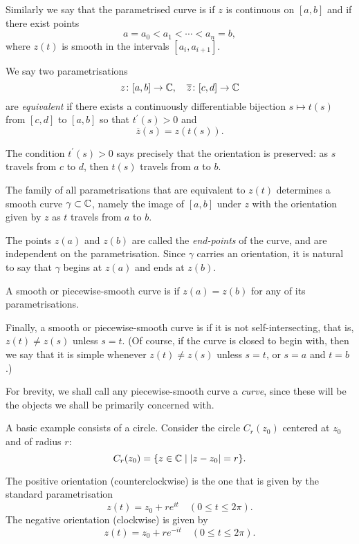 Similarly we say that the parametrised curve is  if $z$ is continuous on $[a,b]$ and if there exist points
\[a=a_0<a_1<\cdots<a_n=b,\]
where $z(t)$ is smooth in the intervals $[a_i,a_{i+1}]$.

We say two parametrisations
\[z\colon[a,b]\to\mathbb C,\quad\overline{z}\colon[c,d]\to\mathbb C\]
are \emph{equivalent} if there exists a continuously differentiable bijection $s\mapsto t(s)$ from $[c,d]$ to $[a,b]$ so that $t^\prime(s)>0$ and
\[\overline{z}(s)=z(t(s)).\]

\begin{remark}
The condition $t^\prime(s)>0$ says precisely that the orientation is preserved: as $s$ travels from $c$ to $d$, then $t(s)$ travels from $a$ to $b$.
\end{remark}

The family of all parametrisations that are equivalent to $z(t)$ determines a smooth curve $\gamma\subset\mathbb C$, namely the image of $[a,b]$ under $z$ with the orientation given by $z$ as $t$ travels from $a$ to $b$. 

The points $z(a)$ and $z(b)$ are called the \emph{end-points} of the curve, and are independent on the parametrisation. 
Since $\gamma$ carries an orientation, it is natural to say that $\gamma$ begins at $z(a)$ and ends at $z(b)$.

A smooth or piecewise-smooth curve is  if $z(a)=z(b)$ for any of its parametrisations. 

Finally, a smooth or piecewise-smooth curve is  if it is not self-intersecting, that is, $z(t)\neq z(s)$ unless $s=t$. (Of course, if the curve is closed to begin with, then we say that it is simple whenever $z(t)\neq z(s)$ unless $s=t$, or $s=a$ and $t=b$.)

For brevity, we shall call any piecewise-smooth curve a \emph{curve}, since these will be the objects we shall be primarily concerned with.

A basic example consists of a circle. Consider the circle $C_r(z_0)$ centered at $z_0$ and of radius $r$:
\[C_r(z_0)=\{z\in\mathbb C\mid |z-z_0|=r\}.\]

\begin{definition}[Orientation]
The positive orientation (counterclockwise) is the one that is given by the standard parametrisation
\[z(t)=z_0+re^{it}\quad(0\le t\le 2\pi).\]
The negative orientation (clockwise) is given by
\[z(t)=z_0+re^{-it}\quad(0\le t\le 2\pi).\]
\end{definition}

